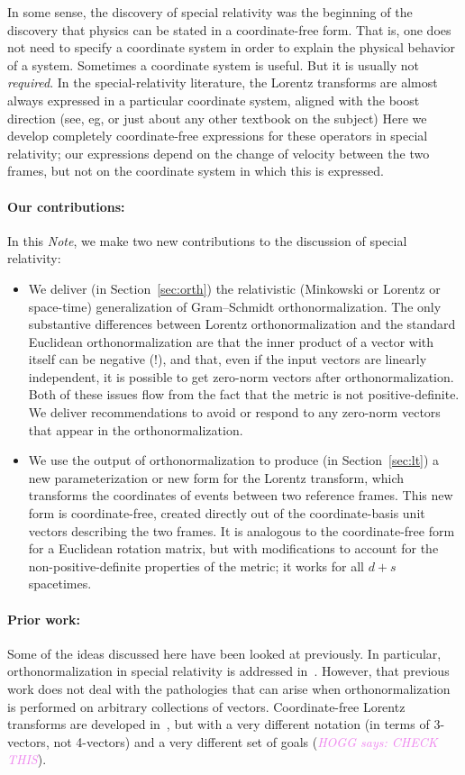\documentclass{article}
\newcommand{\plus}{\!+\!} %
\newcommand{\documentname}{\textsl{Note}}
\newcommand{\secref}[1]{Section~\ref{#1}}
\newcommand{\HOGG}[1]{\textcolor{violet}{\textsl{HOGG says: {#1}}}}
\begin{document}
In some sense, the discovery of special relativity was the beginning of the discovery that physics can be stated in a coordinate-free form.
That is, one does not need to specify a coordinate system in order to explain the physical behavior of a system.
Sometimes a coordinate system is useful.
But it is usually not \emph{required}.
In the special-relativity literature, the Lorentz transforms are almost always expressed in a particular coordinate system, aligned with the boost direction (see, eg, \cite{french, zakamska} or just about any other textbook on the subject)
Here we develop completely coordinate-free expressions for these operators in special relativity; our expressions depend on the change of velocity between the two frames, but not on the coordinate system in which this is expressed.

\paragraph{Our contributions:}
In this \documentname, we make two new contributions to the discussion of special relativity:
\begin{itemize}
\item
We deliver (in \secref{sec:orth}) the relativistic (Minkowski or Lorentz or space-time) generalization of Gram--Schmidt orthonormalization.
The only substantive differences between Lorentz orthonormalization and the standard Euclidean orthonormalization are that the inner product of a vector with itself can be negative (!), and that, even if the input vectors are linearly independent, it is possible to get zero-norm vectors after orthonormalization.
Both of these issues flow from the fact that the metric is not positive-definite.
We deliver recommendations to avoid or respond to any zero-norm vectors that appear in the orthonormalization.
\item
We use the output of orthonormalization to produce (in \secref{sec:lt}) a new parameterization or new form for the Lorentz transform, which transforms the coordinates of events between two reference frames.
This new form is coordinate-free, created directly out of the coordinate-basis unit vectors describing the two frames.
It is analogous to the coordinate-free form for a Euclidean rotation matrix, but with modifications to account for the non-positive-definite properties of the metric; it works for all $d\plus s$ spacetimes.
\end{itemize}

\paragraph{Prior work:}
Some of the ideas discussed here have been looked at previously.
In particular, orthonormalization in special relativity is addressed in~\cite{joot}.
However, that previous work does not deal with the pathologies that can arise when orthonormalization is performed on arbitrary collections of vectors.
Coordinate-free Lorentz transforms are developed in~\cite{wagner}, but with a very different notation (in terms of 3-vectors, not 4-vectors) and a very different set of goals (\HOGG{CHECK THIS}).
\end{document}
